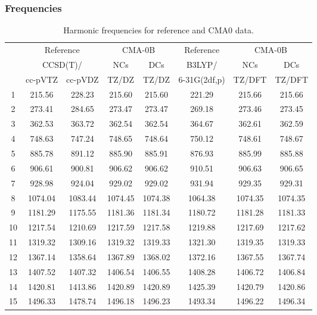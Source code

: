 \documentclass[10pt,oneside]{article}
\begin{document}
\clearpage

\subsubsection*{Frequencies}
\begin{table}[h!]
\centering
\caption{Harmonic frequencies for reference and CMA0 data.}
\begin{tabular}{cccccccc}
\toprule
{} & \multicolumn{2}{c}{Reference} & \multicolumn{2}{c}{CMA-0B} &    Reference & \multicolumn{2}{c}{CMA-0B} \\
{} & \multicolumn{2}{c}{CCSD(T)/} &     NCs &     DCs &       B3LYP/ &     NCs &     DCs \\
{} &   cc-pVTZ & cc-pVDZ &   TZ/DZ &   TZ/DZ & 6-31G(2df,p) &  TZ/DFT &  TZ/DFT \\
\midrule
1  &    215.56 &  228.23 &  215.60 &  215.60 &       221.29 &  215.66 &  215.66 \\
2  &    273.41 &  284.65 &  273.47 &  273.47 &       269.18 &  273.46 &  273.45 \\
3  &    362.53 &  363.72 &  362.54 &  362.54 &       364.67 &  362.61 &  362.59 \\
4  &    748.63 &  747.24 &  748.65 &  748.64 &       750.12 &  748.61 &  748.67 \\
5  &    885.78 &  891.12 &  885.90 &  885.91 &       876.93 &  885.99 &  885.88 \\
6  &    906.61 &  900.81 &  906.62 &  906.62 &       910.51 &  906.63 &  906.65 \\
7  &    928.98 &  924.04 &  929.02 &  929.02 &       931.94 &  929.35 &  929.31 \\
8  &   1074.04 & 1083.44 & 1074.45 & 1074.38 &      1064.38 & 1074.35 & 1074.35 \\
9  &   1181.29 & 1175.55 & 1181.36 & 1181.34 &      1180.72 & 1181.28 & 1181.33 \\
10 &   1217.54 & 1210.69 & 1217.59 & 1217.58 &      1219.88 & 1217.69 & 1217.62 \\
11 &   1319.32 & 1309.16 & 1319.32 & 1319.33 &      1321.30 & 1319.35 & 1319.33 \\
12 &   1367.14 & 1358.64 & 1367.89 & 1368.02 &      1372.16 & 1367.55 & 1367.74 \\
13 &   1407.52 & 1407.32 & 1406.54 & 1406.55 &      1408.28 & 1406.72 & 1406.84 \\
14 &   1420.81 & 1413.86 & 1420.89 & 1420.89 &      1425.39 & 1420.79 & 1420.86 \\
15 &   1496.33 & 1478.74 & 1496.18 & 1496.23 &      1493.34 & 1496.22 & 1496.34 \\

\end{tabular}
\end{table}
\end{document}
